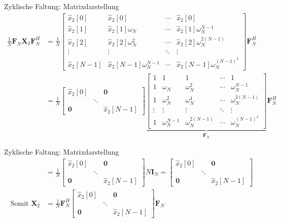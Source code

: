 \documentclass[14pt, aspectratio=169, handout]{beamer}
\begin{document}
\begin{frame}{Zyklische Faltung: Matrixdarstellung}
    \small{
    \begin{align*}
    \frac{1}{N}\mathbf{F}_N \mathbf{X}_2 \mathbf{F}_N^H &= \frac{1}{N} \begin{bmatrix}
        \hat{x}_2[0] & \hat{x}_2[0] & \cdots & \hat{x}_2[0] \\
        \hat{x}_2[1] & \hat{x}_2[1]\omega_N & \cdots & \hat{x}_2[1]\omega_N^{N-1} \\
        \hat{x}_2[2] & \hat{x}_2[2]\omega_N^2 & \cdots & \hat{x}_2[2]\omega_N^{2(N-1)} \\
        \vdots & \vdots & \ddots & \vdots \\
        \hat{x}_2[N-1] & \hat{x}_2[N-1]\omega_N^{N-1} & \cdots & \hat{x}_2[N-1]\omega_N^{(N-1)^2}
    \end{bmatrix} \mathbf{F}_N^H \\
    &= \frac{1}{N} \begin{bmatrix}
        \hat{x}_2[0] & & \mathbf{0} \\
        & \ddots & \\
        \mathbf{0} & & \hat{x}_2[N-1]
    \end{bmatrix} \underbrace{\begin{bmatrix}
        1 & 1 & 1 & \cdots & 1 \\
        1 & \omega_N & \omega_N^2 & \cdots & \omega_N^{N-1} \\
        1 & \omega_N^2 & \omega_N^4 & \cdots & \omega_N^{2(N-1)} \\
        \vdots & \vdots & \vdots & \ddots & \vdots \\
        1 & \omega_N^{N-1} & \omega_N^{2(N-1)} & \cdots & \omega_N^{(N-1)^2}
    \end{bmatrix}}_{\mathbf{F}_N} \mathbf{F}_N^H
\end{align*}}
\end{frame}

\begin{frame}{Zyklische Faltung: Matrixdarstellung}
    \begin{align*}
        &= \frac{1}{N} \begin{bmatrix}
        \hat{x}_2[0] & & \mathbf{0} \\
        & \ddots & \\
        \mathbf{0} & & \hat{x}_2[N-1]
    \end{bmatrix} N \mathbf{I}_N = \begin{bmatrix}
        \hat{x}_2[0] & & \mathbf{0} \\
        & \ddots & \\
        \mathbf{0} & & \hat{x}_2[N-1]
    \end{bmatrix} \\
    \text{Somit } \mathbf{X}_2 &= \frac{1}{N} \mathbf{F}_N^H  \begin{bmatrix}
        \hat{x}_2[0] & & \mathbf{0} \\
        & \ddots & \\
        \mathbf{0} & & \hat{x}_2[N-1]
    \end{bmatrix}   \mathbf{F}_N
    \end{align*}
\end{frame}
\end{document}
